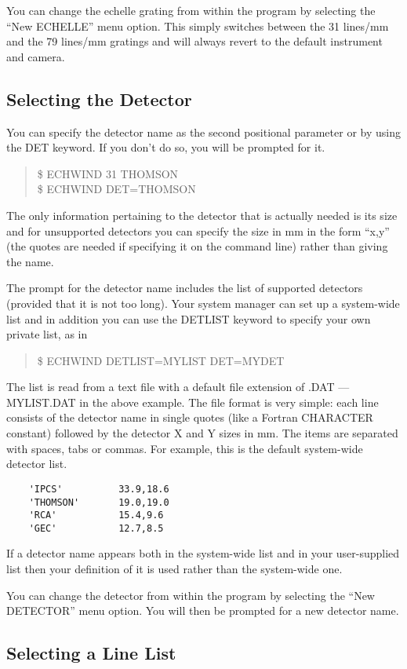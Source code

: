 You can change the echelle grating from within the program by selecting the
``New ECHELLE'' menu option. This simply switches between the 31 lines/mm and
the 79 lines/mm gratings and will always revert to the default instrument and
camera.

\subsection{Selecting the Detector}

You can specify the detector name as the second positional parameter or by
using the DET keyword. If you don't do so, you will be prompted for it.
\begin{quote}
\$ ECHWIND 31 THOMSON \\
\$ ECHWIND DET=THOMSON
\end{quote}

The only information pertaining to the detector that is actually needed is its
size and for unsupported detectors you can specify the size in mm in the form
``x,y'' (the quotes are needed if specifying it on the command line) rather
than giving the name.

The prompt for the detector name includes the list of supported detectors
(provided that it is not too long). Your system manager can set up a
system-wide list and in addition you can use the DETLIST keyword to specify
your own private list, as in
\begin{quote}
\$ ECHWIND DETLIST=MYLIST DET=MYDET
\end{quote}
The list is read from a text file with a default file extension of .DAT ---
MYLIST.DAT in the above example. The file format is very simple: each line
consists of the detector name in single quotes (like a Fortran CHARACTER
constant) followed by the detector X and Y sizes in mm. The items are separated
with spaces, tabs or commas. For example, this is the default system-wide
detector list.
\begin{verbatim}
    'IPCS'          33.9,18.6
    'THOMSON'       19.0,19.0
    'RCA'           15.4,9.6
    'GEC'           12.7,8.5
\end{verbatim}
If a detector name appears both in the system-wide list and in your
user-supplied list then your definition of it is used rather than the
system-wide one.

You can change the detector from within the program by selecting the ``New
DETECTOR'' menu option. You will then be prompted for a new detector name.

\subsection{Selecting a Line List}

